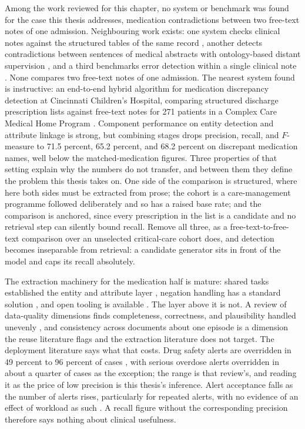 Among the work reviewed for this chapter, no system or benchmark was found for the case this thesis
addresses, medication contradictions between two free-text notes of one admission. Neighbouring work exists:
one system checks clinical notes against the structured tables of the same record
\citep{kwon2024ehrcon}, another detects contradictions between sentences of medical abstracts with
ontology-based distant supervision \citep{makhervaks2023clinical}, and a third benchmarks error
detection within a single clinical note \citep{benabacha2025medec}. None compares two free-text notes
of one admission. The nearest system found is instructive: an end-to-end hybrid
algorithm for medication discrepancy detection at Cincinnati Children's Hospital, comparing
structured discharge prescription lists against free-text notes for 271 patients in a Complex Care
Medical Home Program \citep{li2015discrepancy}. Component performance on entity detection and attribute linkage is strong, but
combining stages drops precision, recall, and $F$-measure to 71.5 percent, 65.2 percent, and 68.2 percent on discrepant
medication names, well below the matched-medication figures. Three properties of that setting explain why
the numbers do not transfer, and between them they define the problem this thesis takes on. One side
of the comparison is structured, where here both sides must be extracted from prose; the cohort is a care-management
programme followed deliberately and so has a raised base rate; and the comparison is anchored, since
every prescription in the list is a candidate and no retrieval step can silently bound recall.
Remove all three, as a free-text-to-free-text comparison over an unselected critical-care cohort
does, and detection becomes inseparable from retrieval: a candidate generator sits in front of the
model and caps its recall absolutely.

The extraction machinery for the medication half is mature: shared tasks established the entity and
attribute layer \citep{uzuner2010medication,henry2020n2c2}, negation handling has a standard solution
\citep{chapman2001negex}, and open tooling is available \citep{neumann2019scispacy,eyre2021medspacy}.
The layer above it is not. A review of data-quality dimensions finds completeness, correctness, and
plausibility handled unevenly \citep{weiskopf2013quality}, and consistency across documents about one episode is a dimension the
reuse literature flags and the extraction literature does not target. The deployment literature says
what that costs. Drug safety alerts are overridden in 49 percent to 96 percent of cases \citep{vandersijs2006overriding}, with serious overdose alerts overridden in about a quarter of cases as the exception; the range is that review's, and reading it as the price of low precision is this thesis's inference.
Alert acceptance falls as the number of alerts rises, particularly for
repeated alerts, with no evidence of an effect of workload as such \citep{ancker2017alertfatigue}. A recall figure
without the corresponding precision therefore says nothing about clinical usefulness.

